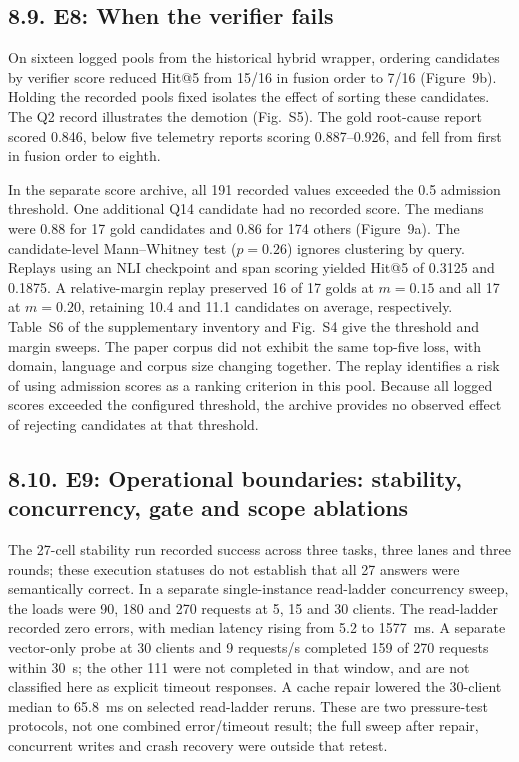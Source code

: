 \subsection{8.9. E8: When the verifier fails}


On sixteen logged pools from the historical hybrid wrapper, ordering
candidates by verifier score reduced Hit@5 from 15/16 in fusion order to
7/16 (Figure~9b). Holding the recorded pools fixed isolates
the effect of sorting these candidates. The Q2 record illustrates the
demotion (Fig.~S5). The gold root-cause report scored 0.846, below five
telemetry reports scoring 0.887--0.926, and fell from first in fusion order
to eighth.

In the separate score archive, all 191 recorded values exceeded the
0.5 admission threshold. One additional Q14 candidate had no recorded
score. The medians were 0.88 for 17 gold candidates and 0.86 for 174
others (Figure~9a). The candidate-level Mann--Whitney
test ($p=0.26$) ignores clustering by query. Replays using an NLI
checkpoint and span scoring yielded Hit@5 of 0.3125 and 0.1875. A
relative-margin replay preserved 16 of 17 golds at $m=0.15$ and all 17
at $m=0.20$, retaining 10.4 and 11.1 candidates on average, respectively.
Table~S6 of the supplementary inventory and Fig.~S4 give the threshold
and margin sweeps. The paper corpus did not exhibit the same top-five
loss, with domain, language and corpus size changing together. The
replay identifies a risk of using admission scores as a ranking
criterion in this pool. Because all logged scores exceeded the configured
threshold, the archive provides no observed effect of rejecting
candidates at that threshold.

\subsection{8.10. E9: Operational boundaries: stability, concurrency, gate and
scope ablations}

The 27-cell stability run recorded success across three tasks, three lanes
and three rounds; these execution statuses do not establish that all 27
answers were semantically correct. In a separate
single-instance read-ladder concurrency sweep, the loads were 90, 180 and
270 requests at 5, 15 and 30 clients. The read-ladder recorded zero errors,
with median latency rising from 5.2 to 1577~ms. A separate vector-only
probe at 30 clients and 9 requests/s completed 159 of 270 requests within
30~s; the other 111 were not completed in that window, and are not
classified here as explicit timeout responses. A cache repair lowered the
30-client median to 65.8~ms on selected read-ladder reruns. These are two
pressure-test protocols, not one combined error/timeout result; the full
sweep after repair, concurrent writes and crash recovery were outside that
retest.

